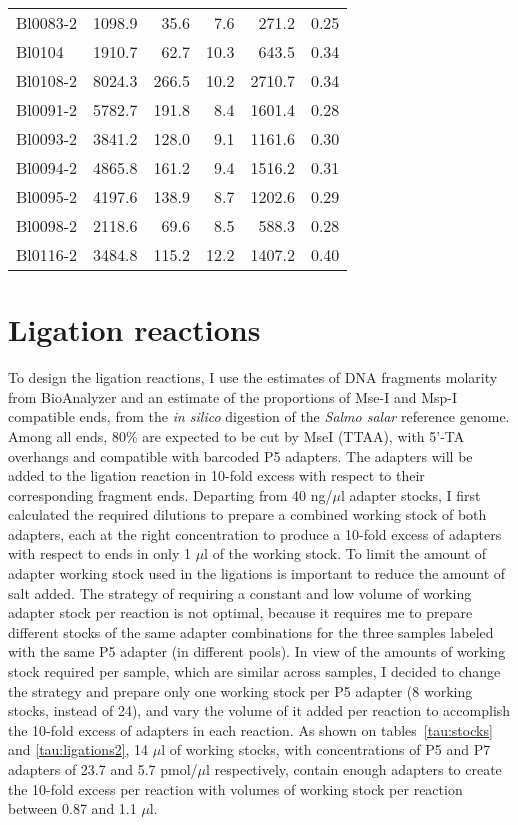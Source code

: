 \documentclass[a4paper,12pt,twosided]{article}
\begin{document}
\begin{table}
\begin{center}
\begin{tabular}{lrrrrr}
Bl0083-2&1098.9&35.6&7.6&271.2&0.25\\
Bl0104&1910.7&62.7&10.3&643.5&0.34\\
Bl0108-2&8024.3&266.5&10.2&2710.7&0.34\\
Bl0091-2&5782.7&191.8&8.4&1601.4&0.28\\
Bl0093-2&3841.2&128.0&9.1&1161.6&0.30\\
Bl0094-2&4865.8&161.2&9.4&1516.2&0.31\\
Bl0095-2&4197.6&138.9&8.7&1202.6&0.29\\
Bl0098-2&2118.6&69.6&8.5&588.3&0.28\\
Bl0116-2&3484.8&115.2&12.2&1407.2&0.40\\
\bottomrule
\end{tabular}
\end{center}
\end{table}

\section{Ligation reactions}
To design the ligation reactions, I use the estimates of DNA fragments molarity from BioAnalyzer and an estimate of the proportions of Mse-I and Msp-I compatible ends, from the \emph{in silico} digestion of the \emph{Salmo salar} reference genome. Among all ends, 80\% are expected to be cut by MseI (TTAA), with 5'-TA overhangs and compatible with barcoded P5 adapters. The adapters will be added to the ligation reaction in 10-fold excess with respect to their corresponding fragment ends. Departing from 40 ng/$\mu$l adapter stocks, I first calculated the required dilutions to prepare a combined working stock of both adapters, each at the right concentration to produce a 10-fold excess of adapters with respect to ends in only 1 $\mu$l of the working stock. To limit the amount of adapter working stock used in the ligations is important to reduce the amount of salt added. The strategy of requiring a constant and low volume of working adapter stock per reaction is not optimal, because it requires me to prepare different stocks of the same adapter combinations for the three samples labeled with the same P5 adapter (in different pools). In view of the amounts of working stock required per sample, which are similar across samples, I decided to change the strategy and prepare only one working stock per P5 adapter (8 working stocks, instead of 24), and vary the volume of it added per reaction to accomplish the 10-fold excess of adapters in each reaction. As shown on tables~\ref{tau:stocks} and \ref{tau:ligations2}, 14 $\mu$l of working stocks, with concentrations of P5 and P7 adapters of 23.7 and 5.7 pmol/$\mu$l respectively, contain enough adapters to create the 10-fold excess per reaction with volumes of working stock per reaction between 0.87 and 1.1 $\mu$l.
\end{document}
